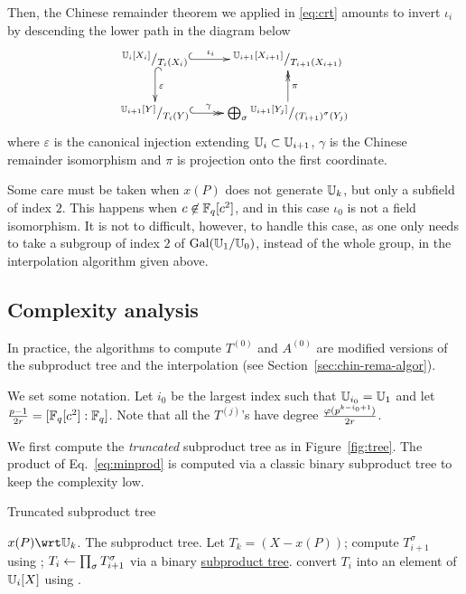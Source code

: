 Then, the Chinese remainder theorem we applied in \eqref{eq:crt}
amounts to invert $\iota_i$ by descending the lower path in the
diagram below
\begin{equation}
  \xymatrix{
    ^{\U_i[X_i]}/_{T_i(X_i)} \ar@{^{(}->}[r]^-{\iota_i} \ar@{^{(}->}[d]^{\varepsilon} &
    ^{\U_{i+1}[X_{i+1}]}/_{T_{i+1}(X_{i+1})} \\
    ^{\U_{i+1}[Y]}/_{T_i(Y)} \ar@{^{(}->>}[r]^-{\gamma} &
    \bigoplus_\sigma {}^{\U_{i+1}[Y_{j}]}/_{\left(T_{i+1}\right)^\sigma(Y_{j})} \ar@{->>}[u]_{\pi}
  }
\end{equation}
where $\varepsilon$ is the canonical injection extending
$\mathbb{U}_i\subset\mathbb{U}_{i+1}$, $\gamma$ is the Chinese remainder isomorphism
and $\pi$ is projection onto the first coordinate.

Some care must be taken when $x(P)$ does not generate $\mathbb{U}_k$, but only
a subfield of index $2$. This happens when $c\not\in\mathbb{F}_q[c^2]$, and in
this case $\iota_0$ is not a field isomorphism. It is not to
difficult, however, to handle this case, as one only needs to take a
subgroup of index $2$ of $\operatorname{Gal}(\mathbb{U}_1/\mathbb{U}_0)$, instead of the whole
group, in the interpolation algorithm given above.


\subsection{Complexity analysis}
\label{sec:C2-AS-FI:complexity}

In practice, the algorithms to compute $T^{(0)}$ and $A^{(0)}$ are
modified versions of the subproduct tree and the interpolation (see
Section~\ref{sec:chin-rema-algor}).

We set some notation. Let $i_0$ be the largest index such that
$\mathbb{U}_{i_0} = \mathbb{U}_1$ and let $\frac{p-1}{2r} = [\mathbb{F}_q[c^2]:\mathbb{F}_q]$.  Note
that all the $T^{(j)}$'s have degree $\frac{\varphi(p^{k-i_0+1})}{2r}$.

We first compute the \emph{truncated} subproduct tree as in
Figure~\ref{fig:tree}. The product of Eq.~\eqref{eq:minprod} is
computed via a classic binary subproduct tree to keep the complexity
low.

\begin{algorithm}
  \caption{Truncated subproduct tree}
  \begin{algorithmic}[1]
    \REQUIRE $x(P)\wrt\U_k$.
    \ENSURE The subproduct tree.
    \STATE Let $T_k = (X - x(P))$;
    \STATE\label{alg:T:gal} compute $T_{i+1}^\sigma$  using ;
    \ENDFOR
    \STATE\label{alg:T:prod}  $T_i\leftarrow\prod_\sigma T_{i+1}^\sigma$ 
    via a binary \hyperref[sec:chin-rema-algor]{subproduct tree}.
    \STATE\label{alg:T:push} convert $T_i$  into an element of
    $\mathbb{U}_i[X]$ using .
    \ENDFOR
  \end{algorithmic}
\end{algorithm}

